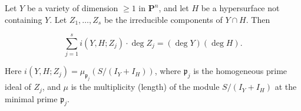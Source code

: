 Let $Y$ be a variety of dimension $\geqslant 1$ in $\mathbf{P}^n$, and let $H$ be a hypersurface not containing $Y$. Let $Z_1, \ldots, Z_s$ be the irreducible components of $Y \cap H$. Then

$$\sum_{j=1}^{s} i(Y,H; Z_j) \cdot \deg Z_j = (\deg Y)(\deg H).$$

Here $i(Y,H; Z_j) = \mu_{\mathfrak{p}_j}(S/(I_Y + I_H))$, where $\mathfrak{p}_j$ is the homogeneous prime ideal of $Z_j$, and $\mu$ is the multiplicity (length) of the module $S/(I_Y + I_H)$ at the minimal prime $\mathfrak{p}_j$.
